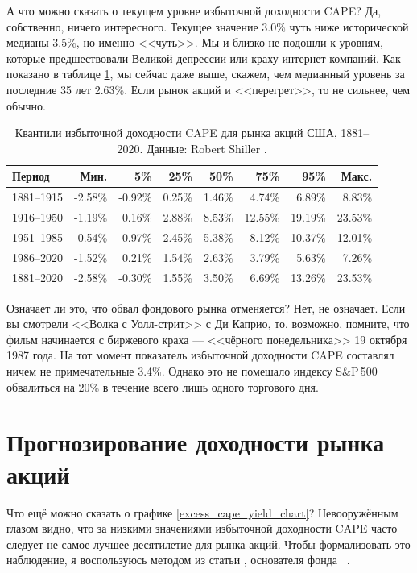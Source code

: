 А что можно сказать о текущем уровне избыточной доходности CAPE? Да, собственно, ничего интересного. Текущее значение 3.0\% чуть ниже исторической медианы 3.5\%, но именно <<чуть>>. Мы и близко не подошли к уровням, которые предшествовали Великой депрессии или краху интернет-компаний. Как показано в таблице \ref{cape_excess_yield_quantiles_table}, мы сейчас даже выше, скажем,  чем медианный уровень за последние 35 лет 2.63\%. Если рынок акций и <<перегрет>>, то не сильнее, чем обычно.

\begin{table}[ht]
\centering
\begin{tabular}{l|r|r|r|r|r|r|r}
Период       & Мин.      & 5\%       & 25\%   & 50\%    & 75\%      & 95\% & Макс. \\ \hline
1881--1915 & -2.58\% & -0.92\% & 0.25\% & 1.46\% &   4.74\% & 6.89\%  & 8.83\% \\
1916--1950 & -1.19\% &  0.16\% & 2.88\% & 8.53\% & 12.55\%  & 19.19\% & 23.53\% \\
1951--1985 &  0.54\% &  0.97\% & 2.45\% & 5.38\% &   8.12\%  & 10.37\% & 12.01\% \\
1986--2020 & -1.52\% &  0.21\% & 1.54\% & 2.63\% &   3.79\%  & 5.63\%  & 7.26\% \\ \hline
1881--2020 & -2.58\% & -0.30\% & 1.55\% & 3.50\% &   6.69\%  & 13.26\% & 23.53\%
\end{tabular}
\caption{Квантили избыточной доходности CAPE для рынка акций США, 1881--2020. Данные: Robert Shiller \cite{shillerOnline}.}
\label{cape_excess_yield_quantiles_table}
\end{table}

Означает ли это, что обвал фондового рынка отменяется? Нет, не означает. Если вы смотрели <<Волка с Уолл-стрит>> с Ди Каприо, то, возможно, помните, что фильм начинается с биржевого краха --- <<чёрного понедельника>> 19 октября 1987 года. На тот момент показатель избыточной доходности CAPE составлял ничем не примечательные 3.4\%. Однако это не помешало индексу S\&P\,500 обвалиться на 20\% в течение всего лишь одного торгового дня. 


\section*{Прогнозирование доходности рынка акций}

Что ещё можно сказать о графике \ref{excess_cape_yield_chart}? Невооружённым глазом видно, что за низкими значениями избыточной доходности CAPE часто следует не самое лучшее десятилетие для рынка акций. Чтобы формализовать это наблюдение, я воспользуюсь методом из статьи , основателя фонда \ \cite{asness2012old}.

